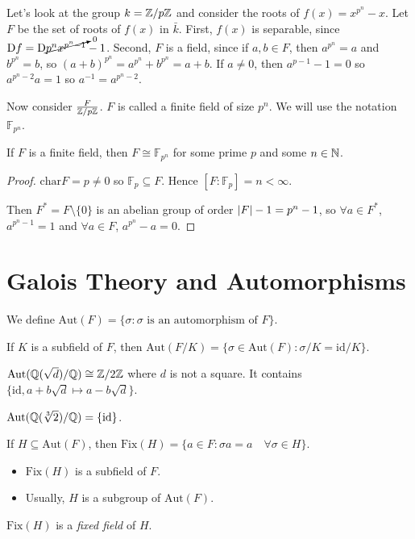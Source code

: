 \documentclass[a4paper,twoside,master.tex]{subfiles}
\begin{document}

Let's look at the group $ k = \mathbb{Z}/p\mathbb{Z} $ and consider the roots of $ f(x) = x^{p^n} - x $. Let $ F $ be the set of roots of $ f(x) $ in $ \bar{k} $. First, $ f(x) $ is separable, since $ \mathrm{D} f = \mathrm{D} \cancelto{0}{p^n x^{p^n - 1}} - 1 $. Second, $ F $ is a field, since if $ a,b \in F $, then $ a^{p^n} = a $ and $ b^{p^n} = b $, so $ (a + b)^{p^n} = a^{p^n} + b^{p^n} = a + b $. If $ a \neq 0 $, then $ a^{p-1} - 1 = 0 $ so $ a^{p^n - 2} a = 1 $ so $ a^{-1} = a^{p^n - 2} $.

Now consider $ \frac{F}{\mathbb{Z}/p\mathbb{Z}} $. $ F $ is called a finite field of size $ p^n $. We will use the notation $ \mathbb{F}_{p^n} $.

\begin{theorem}
    If $ F $ is a finite field, then $ F \cong \mathbb{F}_{p^n} $ for some prime $ p $ and some $ n \in \mathbb{N} $.
\end{theorem}
\begin{proof}
    $ \text{char} F = p \neq 0 $ so $ \mathbb{F}_{p} \subseteq F $. Hence $ [F\colon\mathbb{F}_p] = n < \infty $.

    Then $ F^* = F \setminus \{0\} $ is an abelian group of order $ \abs{F} - 1 = p^n - 1 $, so $ \forall a \in F^* $, $ a^{p^n - 1} = 1 $ and $ \forall a \in F $, $ a^{p^n} - a = 0 $.
\end{proof}

\section{Galois Theory and Automorphisms}\label{sec:galois_theory_and_automorphisms}

We define $ \text{Aut}(F) = \{\sigma \colon \sigma \text{ is an automorphism of } F\} $.

If $ K $ is a subfield of $ F $, then $ \text{Aut}(F/K) = \{\sigma \in \text{Aut}(F) \colon \sigma/K = \text{id}/K\} $.

\begin{ex}
    $ \text{Aut}(\mathbb{Q}(\sqrt{d})/\mathbb{Q}) \cong \mathbb{Z}/2\mathbb{Z} $ where $ d $ is not a square. It contains $ \{\text{id}, a + b \sqrt{d} \mapsto a - b \sqrt{d}\} $.
\end{ex}
\begin{ex}
    $ \text{Aut}(\mathbb{Q}(\sqrt[3]{2})/\mathbb{Q}) = \{\text{id}\} $.
\end{ex}

\begin{definition}
    If $ H \subseteq \text{Aut}(F) $, then $ \text{Fix}(H) = \{a \in F \colon \sigma a = a \quad \forall \sigma \in H\} $.
\end{definition}
\begin{itemize}
    \item $ \text{Fix}(H) $ is a subfield of $ F $.
    \item Usually, $ H $ is a subgroup of $ \text{Aut}(F) $.
\end{itemize}
$ \text{Fix}(H) $ is a \textit{fixed field} of $ H $.
\end{document}

